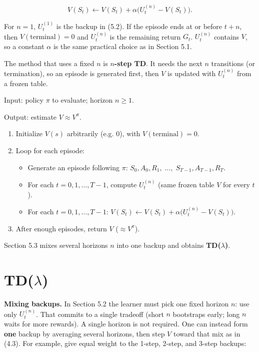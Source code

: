 \[
V(S_t)\leftarrow V(S_t)+\alpha\bigl(U_t^{(n)}-V(S_t)\bigr).
\]

For $n=1$, $U_t^{(1)}$ is the backup in (5.2). If the episode ends at or before $t+n$, then $V(\text{terminal})=0$ and $U_t^{(n)}$ is the remaining return $G_t$. $U_t^{(n)}$ contains $V$, so a constant $\alpha$ is the same practical choice as in Section 5.1.

The method that uses a fixed $n$ is \textbf{$n$-step TD}. It needs the next $n$ transitions (or termination), so an episode is generated first, then $V$ is updated with $U_t^{(n)}$ from a frozen table.

\begin{implnote}
Input: policy $\pi$ to evaluate; horizon $n\ge 1$.

Output: estimate $V\approx V^\pi$.

\begin{enumerate}
\item Initialize $V(s)$ arbitrarily (e.g. $0$), with $V(\text{terminal})=0$.
\item Loop for each episode:
\begin{itemize}
\item Generate an episode following $\pi$:   $S_0,A_0,R_1,\;\ldots,\;S_{T-1},A_{T-1},R_T$.
\item For each $t=0,1,\ldots,T{-}1$, compute $U_t^{(n)}$ (same frozen table $V$ for every $t$).
\item For each $t=0,1,\ldots,T{-}1$:   $V(S_t)\leftarrow V(S_t)+\alpha\bigl(U_t^{(n)}-V(S_t)\bigr)$.
\end{itemize}
\item After enough episodes, return $V$ ($\approx V^\pi$).
\end{enumerate}

\end{implnote}




Section 5.3 mixes several horizons $n$ into one backup and obtains \textbf{TD($\lambda$)}.

\section{TD($\lambda$)}

\textbf{Mixing backups.} In Section 5.2 the learner must pick one fixed horizon $n$: use only $U_t^{(n)}$. That commits to a single tradeoff (short $n$ bootstraps early; long $n$ waits for more rewards). A single horizon is not required. One can instead form \textbf{one} backup by averaging several horizons, then step $V$ toward that mix as in (4.3). For example, give equal weight to the 1-step, 2-step, and 3-step backups:

